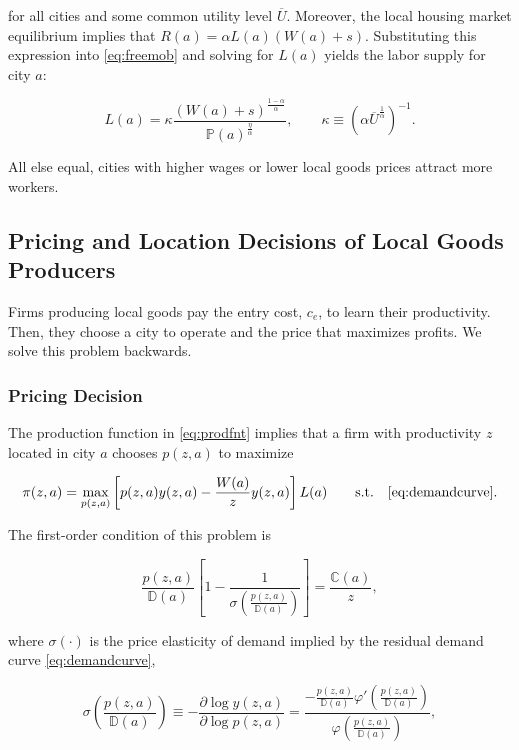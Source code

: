 for all cities and some common utility level $\overline{U}$. Moreover, the local housing market equilibrium implies that $R(a) = \alpha L(a)(W(a)+s)$. Substituting this expression into \eqref{eq:freemob} and solving for $L(a)$ yields the labor supply for city $a$:  

\begin{equation}\label{eq:laborsuppbasic}
	L(a) = \kappa \frac{(W(a)+s)^{\frac{1-\alpha}{\alpha}}}{\mathbb{P}(a)^{\frac{\eta}{\alpha}}}, \qquad \kappa \equiv \left(\alpha \overline{U}^{\frac{1}{\alpha}}\right)^{-1}.
\end{equation}  

All else equal, cities with higher wages or lower local goods prices attract more workers.

\subsection{Pricing and Location Decisions of Local Goods Producers}
Firms producing local goods pay the entry cost, $c_e$, to learn their productivity. Then, they choose a city to operate and the price that maximizes profits. We solve this problem backwards. 

\subsubsection{Pricing Decision}\label{s:profitmax}
The production function in \eqref{eq:prodfnt} implies that a firm with productivity $z$ located in city $a$ chooses $p(z,a)$ to maximize  

\begin{equation}\label{eq:profits}
	\pi(z, a) = \max_{p(z,a)} \left[p(z,a) y(z,a) - \frac{W(a)}{z} y(z,a)\right]L(a) \qquad \text{s.t.} \quad \eqref{eq:demandcurve}.
\end{equation}  

The first-order condition of this problem is  

\begin{equation}\label{eq:focprod}
	\frac{p(z,a)}{\mathbb{D}(a)}\left[1 - \frac{1}{\sigma\left(\frac{p(z,a)}{\mathbb{D}(a)}\right)} \right] = \frac{\mathbb{C}(a)}{z},
\end{equation}  

where $\sigma(\cdot)$ is the price elasticity of demand implied by the residual demand curve \eqref{eq:demandcurve},  

\begin{equation}\label{eq:gensigma}
	\sigma\left(\frac{p(z,a)}{\mathbb{D}(a)}\right) \equiv - \frac{\partial \log y(z,a)}{\partial \log p(z,a)} = \frac{-\frac{p(z,a)}{\mathbb{D}(a)} \varphi' \left(\frac{p(z,a)}{\mathbb{D}(a)}\right)}{\varphi\left(\frac{p(z,a)}{\mathbb{D}(a)}\right)},
\end{equation}  

